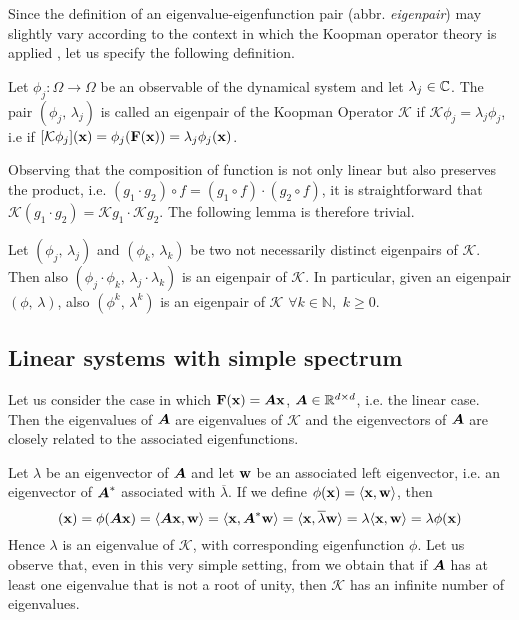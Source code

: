 Since the definition of an eigenvalue-eigenfunction pair (abbr. \emph{eigenpair}) may slightly vary according to the context in which the Koopman operator theory is applied \cite{}, let us specify the following definition.
\begin{definition}
Let $\phi_j:\Omega\to\Omega$ be an observable of the dynamical system and let $\lambda_j\in\mathbb{C}$. The pair $(\phi_j, \,\lambda_j)$ is called an eigenpair of the Koopman Operator $\mathcal{K}$ if $\mathcal{K}\phi_j = \lambda_j\phi_j$, i.e if $[\mathcal{K}\phi_j](\vb{x}) = \phi_j(\vb{F}(\vb{x})) = \lambda_j\phi_j(\vb{x})$.
\end{definition}

Observing that the composition of function is not only linear but also preserves the product, i.e. $(g_1 \cdot g_2) \circ f = (g_1 \circ f) \cdot (g_2 \circ f)$, it is straightforward that $\mathcal{K}(g_1\cdot g_2) = \mathcal{K}g_1\cdot \mathcal{K}g_2$. The following lemma is therefore trivial.
\begin{lemma}
\label{eigenpair_multiplication}
Let $(\phi_j, \,\lambda_j)$ and $(\phi_k, \,\lambda_k)$ be two not necessarily distinct eigenpairs of $\mathcal{K}$. Then also $(\phi_j\cdot\phi_k, \,\lambda_j\cdot\lambda_k)$ is an eigenpair of $\mathcal{K}$. In particular, given an eigenpair $(\phi, \,\lambda)$, also $(\phi^k, \,\lambda^k)$ is an eigenpair of $\mathcal{K}$ $\forall k\in\mathbb{N},\,\, k \geq 0$.
\end{lemma}

\subsection{Linear systems with simple spectrum}
Let us consider the case in which $\vb{F}(\vb{x}) = \vb*{A}\vb{x}$, $\vb*{A}\in\mathbb{R}^{d\times d}$, i.e. the linear case. Then the eigenvalues of $\vb*{A}$ are eigenvalues of $\mathcal{K}$ and the eigenvectors of $\vb*{A}$ are closely related to the associated eigenfunctions.

Let $\lambda$ be an eigenvector of $\vb*{A}$ and let $\vb{w}$ be an associated left eigenvector, i.e. an eigenvector of $\vb*{A}^*$ associated with $\overline{\lambda}$. If we define $\phi(\vb{x}) = \langle \vb{x},\vb{w} \rangle$, then
\begin{equation*}
    [\mathcal{K}\phi](\vb{x}) = \phi(\vb*{A}\vb{x}) = \langle \vb*{A}\vb{x},\vb{w} \rangle = \langle \vb{x}, \vb*{A}^*\vb{w} \rangle = \langle \vb{x}, \overline{\lambda}\vb{w} \rangle = \lambda \langle \vb{x},\vb{w} \rangle = \lambda \phi(\vb{x})
\end{equation*}
Hence $\lambda$ is an eigenvalue of $\mathcal{K}$, with corresponding eigenfunction $\phi$. Let us observe that, even in this very simple setting, from  we obtain that if $\vb*{A}$ has at least one eigenvalue that is not a root of unity, then $\mathcal{K}$ has an infinite number of eigenvalues.

